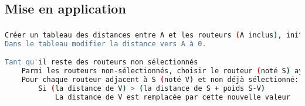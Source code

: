 \documentclass[svgnames,11pt]{beamer}
\begin{document}
\subsection{Mise en application}
\begin{frame}[fragile]
    \frametitle{}

    \begin{center}
        \begin{lstlisting}[language=bash, basicstyle=\small, xrightmargin=0.5em, xleftmargin=0.5em]
Créer un tableau des distances entre A et les routeurs (A inclus), initialisées à l'infini.
Dans le tableau modifier la distance vers A à 0.

Tant qu'il reste des routeurs non sélectionnés
    Parmi les routeurs non-sélectionnés, choisir le routeur (noté S) ayant la plus petite distance.
    Pour chaque routeur adjacent à S (noté V) et non déjà sélectionné:
        Si (la distance de V) > (la distance de S + poids S-V)
            La distance de V est remplacée par cette nouvelle valeur
    \end{lstlisting}
        \label{dj}
    \end{center}
\end{frame}
\end{document}
